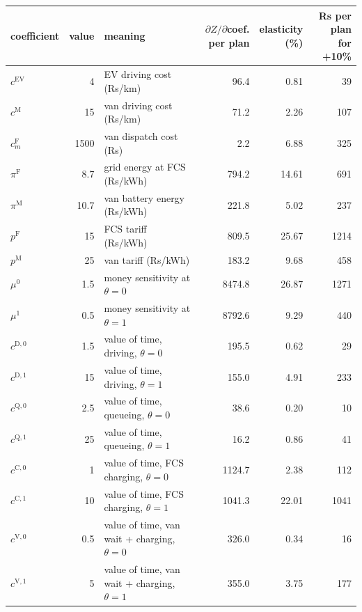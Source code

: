\begin{tabular}{@{}lrlrrr@{}}
\toprule
coefficient & value & meaning & \shortstack[r]{$\partial Z/\partial$coef.\\per plan} & \shortstack[r]{elasticity\\(\%)} & \shortstack[r]{Rs per plan\\for +10\%} \\
\midrule
$c^{\mathrm{EV}}$ & 4 & EV driving cost (Rs/km) & 96.4 & 0.81 & 39 \\
$c^{\mathrm M}$ & 15 & van driving cost (Rs/km) & 71.2 & 2.26 & 107 \\
$c^{\mathrm F}_m$ & 1500 & van dispatch cost (Rs) & 2.2 & 6.88 & 325 \\
$\pi^{\mathrm F}$ & 8.7 & grid energy at FCS (Rs/kWh) & 794.2 & 14.61 & 691 \\
$\pi^{\mathrm M}$ & 10.7 & van battery energy (Rs/kWh) & 221.8 & 5.02 & 237 \\
$p^{\mathrm F}$ & 15 & FCS tariff (Rs/kWh) & 809.5 & 25.67 & 1214 \\
$p^{\mathrm M}$ & 25 & van tariff (Rs/kWh) & 183.2 & 9.68 & 458 \\
$\mu^{0}$ & 1.5 & money sensitivity at $\theta=0$ & 8474.8 & 26.87 & 1271 \\
$\mu^{1}$ & 0.5 & money sensitivity at $\theta=1$ & 8792.6 & 9.29 & 440 \\
$c^{\mathrm{D},0}$ & 1.5 & value of time, driving, $\theta=0$ & 195.5 & 0.62 & 29 \\
$c^{\mathrm{D},1}$ & 15 & value of time, driving, $\theta=1$ & 155.0 & 4.91 & 233 \\
$c^{\mathrm{Q},0}$ & 2.5 & value of time, queueing, $\theta=0$ & 38.6 & 0.20 & 10 \\
$c^{\mathrm{Q},1}$ & 25 & value of time, queueing, $\theta=1$ & 16.2 & 0.86 & 41 \\
$c^{\mathrm{C},0}$ & 1 & value of time, FCS charging, $\theta=0$ & 1124.7 & 2.38 & 112 \\
$c^{\mathrm{C},1}$ & 10 & value of time, FCS charging, $\theta=1$ & 1041.3 & 22.01 & 1041 \\
$c^{\mathrm{V},0}$ & 0.5 & value of time, van wait + charging, $\theta=0$ & 326.0 & 0.34 & 16 \\
$c^{\mathrm{V},1}$ & 5 & value of time, van wait + charging, $\theta=1$ & 355.0 & 3.75 & 177 \\
\bottomrule
\end{tabular}
